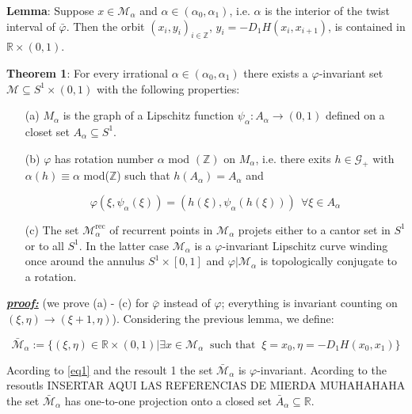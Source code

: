 \documentclass{article}
\begin{document}
\noindent \textbf{Lemma}: Suppose $x \in \mathcal{M}_{\alpha}$ and $\alpha \in ( \alpha_0, \alpha_1)$, i.e. $\alpha$ is the interior of the twist interval of $\bar{\varphi}$. Then the orbit $(x_i, y_i)_{i \in \mathbb{Z}}$, $y_i = -D_1 H (x_i, x_{i + 1})$, is contained in 
$\mathbb{R} \times (0, 1)$. 


\noindent \textbf{Theorem 1}: For every irrational $\alpha \in ( \alpha_0, \alpha_1)$ there exists a $\varphi$-invariant set $\mathcal{M} \subseteq S^{1} \times (0, 1)$ with the following properties:
	\begin{itemize}
		\item[(a)] $M_{\alpha}$ is the graph of a Lipschitz function $\psi_{\alpha}: A_{\alpha} \rightarrow (0, 1)$ defined on a closet set $A_{\alpha} \subseteq S^{1}$.
		\item[(b)] $\varphi$ has rotation number $\alpha$  mod $(\mathbb{Z})$ on $M_{\alpha}$, i.e. there exits $h \in \mathcal{G}_{+}$ with $\alpha (h) \equiv \alpha$ mod($\mathbb{Z}$) such that $h(A_{\alpha}) = A_{\alpha}$ and
		
		$$
			\varphi ( \xi, \psi_{\alpha} (\xi) ) = ( h (\xi), \psi_{\alpha} (h(\xi) ) ) \ \ \forall \xi \in A_{\alpha} 		
		$$
		
		\item[(c)] The set $\mathcal{M}_{\alpha}^{\text{rec}}$ of recurrent points in $\mathcal{M}_{\alpha}$ projets either to a cantor set in $S^1$ or to all $S^{1}$. In the latter case $\mathcal{M}_{\alpha}$ is a $\varphi$-invariant Lipschitz curve winding once around the annulus $S^{1} \times [0, 1]$ and $\varphi | \mathcal{M}_{\alpha}$ is topologically conjugate to a rotation.
	\end{itemize}
 
\color{blue}
	\noindent \underline{\textbf{\textit{proof:}}} (we prove (a) - (c) for $\bar{\varphi}$ instead of $\varphi$; everything is invariant counting on $(\xi, \eta) \rightarrow (\xi + 1, \eta)$). Considering the previous lemma, we define:
	
	$$
		\bar{\mathcal{M}}_{\alpha} := \{
		(\xi, \eta) \in \mathbb{R} \times (0, 1) | \exists x \in \mathcal{M}_{\alpha} \ \text{ such that } \ \xi = x_0, \eta = - D_1 H(x_0, x_1)
		\}
	$$

\noindent Acording to \ref{eq1} and the resoult 1 the set $\bar{\mathcal{M}}_{\alpha}$ is $\varphi$-invariant. Acording to the resoutls INSERTAR AQUI LAS REFERENCIAS DE MIERDA MUHAHAHAHA the set $\bar{\mathcal{M}}_{\alpha}$ has one-to-one projection onto a closed set $\bar{A}_{\alpha} \subseteq \mathbb{R}$.
\end{document}
